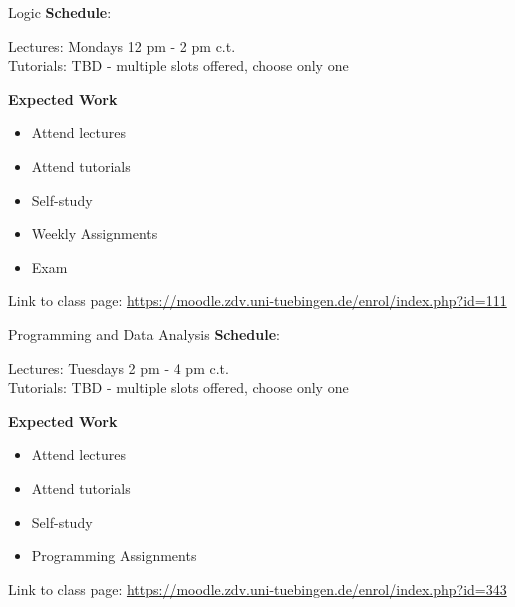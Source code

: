 \documentclass[aspectratio=169,hyperref={unicode},xcolor={dvipsnames}]{beamer}
\begin{document}
\begin{frame}{Logic}
		\textbf{Schedule}:
		
		Lectures: Mondays 12 pm - 2 pm c.t.\\
		Tutorials: TBD - multiple slots offered, choose only one
		\newline
		
		\textbf{Expected Work}
		\begin{itemize}
			\item Attend lectures
			\item Attend tutorials
			\item Self-study
			\item Weekly Assignments
			\item Exam
		\end{itemize}
		
		\begin{center}
	Link to class page: \url{https://moodle.zdv.uni-tuebingen.de/enrol/index.php?id=111}
\end{center}
\end{frame}

\begin{frame}{Programming and Data Analysis}
		\textbf{Schedule}:
		
		Lectures: Tuesdays 2 pm - 4 pm c.t.\\
		Tutorials: TBD - multiple slots offered, choose only one
		\newline
		
		\textbf{Expected Work}
		\begin{itemize}
			\item Attend lectures
			\item Attend tutorials
			\item Self-study
			\item Programming Assignments
		\end{itemize}
		
		\begin{center}
	Link to class page: \url{https://moodle.zdv.uni-tuebingen.de/enrol/index.php?id=343}
\end{center}
\end{frame}
\end{document}
